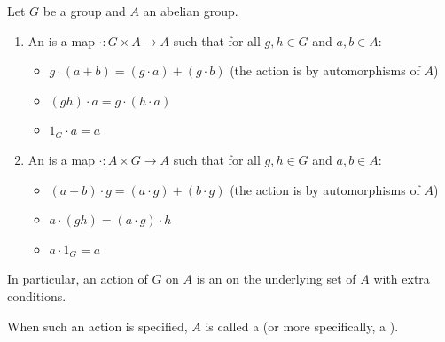 \begin{definition} \label{definition:action_of_a_group_on_an_abelian_group}
Let $G$ be a group and $A$ an abelian group. 

\begin{enumerate}

    \item An  is a map $\cdot: G \times A \to A$ such that for all $g, h \in G$ and $a, b \in A$:

    \begin{itemize}
        \item $g \cdot (a + b) = (g \cdot a) + (g \cdot b)$ (the action is by automorphisms of $A$)
        \item $(gh) \cdot a = g \cdot (h \cdot a)$
        \item $1_G \cdot a = a$
    \end{itemize}

    \item An  is a map $\cdot: A \times G \to A$ such that for all $g, h \in G$ and $a, b \in A$:
    \begin{itemize}
        \item $(a + b) \cdot g = (a \cdot g) + (b \cdot g)$ (the action is by automorphisms of $A$)
        \item $a \cdot (gh) = (a \cdot g) \cdot h$
        \item $a \cdot 1_G = a$
    \end{itemize}
\end{enumerate}
In particular, an action of $G$ on $A$ is an  on the underlying set of $A$ with extra conditions.

When such an action is specified, $A$ is called a  (or more specifically, a ). 

\end{definition}